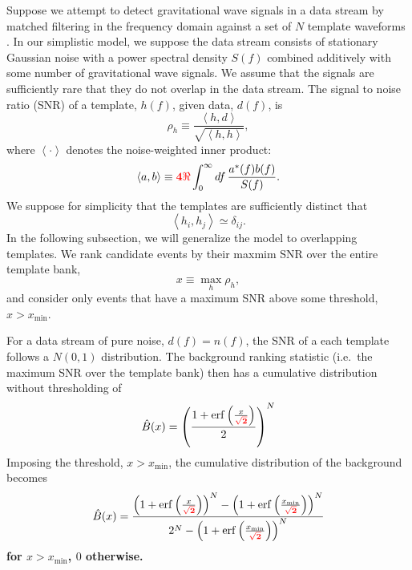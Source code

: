 \documentclass[aps,prd]{revtex4-1}
\newcommand{\xmin}{x_\mathrm{min}}
\newcommand{\ilya}[1]{{\color{red} \bf #1}}
\DeclareMathOperator{\erf}{erf}
\begin{document}
Suppose we attempt to detect gravitational wave signals in a data
stream by matched filtering in the frequency domain against a set of
$N$ template waveforms \citep[e.g.,][]{findchirppaper,LVC2011}.  In our simplistic
model, we suppose the data stream consists of stationary Gaussian
noise with a power spectral density $S(f)$ combined additively with
some number of gravitational wave signals.  We assume that the signals
are sufficiently rare that they do not overlap in the data stream.
The signal to noise ratio (SNR) of a template, $h(f)$, given data,
$d(f)$, is
\begin{equation}
  \rho_h \equiv \frac{\left\langle h, d \right\rangle}{\sqrt{\left
        \langle h, h \right\rangle}},
\end{equation}
where $\left \langle \cdot \right\rangle$ denotes the noise-weighted
inner product:
\begin{equation}
  \left\langle a, b \right\rangle \equiv \ilya{4 \Re} \int_0^\infty df\,
  \frac{a^*(f) b(f)}{S(f)}.
\end{equation}
We suppose for simplicity that the templates are sufficiently distinct
that 
\begin{equation}
  \left\langle h_i, h_j \right\rangle \simeq \delta_{ij}.
\end{equation}
In the following subsection, we will generalize the model to
overlapping templates.  We rank candidate events by their maxmim SNR
over the entire template bank,
\begin{equation}
  x \equiv \max_{h} \rho_h,
\end{equation}
and consider only events that have a maximum SNR above some threshold,
$x > \xmin$.

For a data stream of pure noise, $d(f) = n(f)$, the SNR of a each
template follows a $N(0,1)$ distribution.  The background ranking
statistic (i.e.\ the maximum SNR over the template bank) then has a
cumulative distribution without thresholding of
\begin{equation}
  \hat{B}(x) = \left( \frac{1 + \erf\left( \frac{x}{\ilya{\sqrt{2}}}
      \right)}{2} \right)^N
\end{equation}
Imposing the threshold, $x > \xmin$, the
cumulative distribution of the background becomes
\begin{equation}
  \label{eq:analytic-background-rate}
  \hat{B}(x) = \frac{\left( 1 + \erf\left( \frac{x}{\ilya{\sqrt{2}}} \right)
    \right)^N - \left( 1 + \erf\left( \frac{\xmin}{\ilya{\sqrt{2}}} \right)
    \right)^N}{2^N - \left( 1 + \erf\left( \frac{\xmin}{\ilya{\sqrt{2}}} \right)
    \right)^N }
\end{equation}
\ilya{for $x>\xmin$, $0$ otherwise.}
\end{document}
